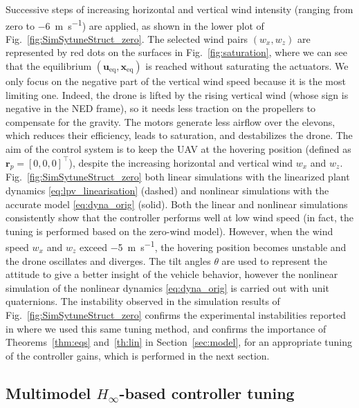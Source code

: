 Successive steps of increasing horizontal and vertical wind intensity (ranging from zero to \SI{-6}{\meter\per\second}) are applied, as shown in the lower plot of Fig.~\ref{fig:SimSytuneStruct_zero}. The selected wind pairs $(w_{x}, w_{z})$ are represented by red dots on the surfaces in Fig.~\ref{fig:saturation}, where we can see that the equilibrium $(\boldsymbol{u}_{\text{eq}}, \boldsymbol{x}_{\text{eq}})$ is reached without saturating the actuators. We only focus on the negative part of the vertical wind speed because it is the most limiting one. Indeed, the drone is lifted by the rising vertical wind (whose sign is negative in the NED frame), so it needs less traction on the propellers to compensate for the gravity. The motors generate less airflow over the elevons, which reduces their efficiency, leads to saturation, and destabilizes the drone.
The aim of the control system is to keep the UAV at the hovering position (defined as $\boldsymbol{r}_{p} = [0,0,0]^\top$), despite the increasing horizontal and vertical wind $w_{x}$ and $w_{z}$. Fig.~\ref{fig:SimSytuneStruct_zero} both linear simulations with the linearized plant dynamics \eqref{eq:lpv_linearisation} (dashed) and nonlinear simulations with the accurate model \eqref{eq:dyna_orig} (solid). Both the linear and nonlinear simulations consistently show that the controller performs well at low wind speed (in fact, the tuning is performed based on the zero-wind model). However, when the wind speed $w_{x}$ and $w_{z}$ exceed \SI{-5}{\meter\per\second}, the hovering position becomes unstable and the drone oscillates and diverges. The tilt angles $\theta$ are used to represent the attitude to give a better insight of the vehicle behavior, however the nonlinear simulation of the nonlinear dynamics \eqref{eq:dyna_orig} is carried out with unit quaternions. The instability observed in the simulation results of Fig.~\ref{fig:SimSytuneStruct_zero} confirms the experimental instabilities reported in \cite{SANSOU:ACA} where we used this same tuning method, and confirms the importance of Theorems~\ref{thm:eqs} and~\ref{th:lin} in Section~\ref{sec:model}, for an appropriate tuning of the controller gains, which is performed in the next section.

\subsection{\texorpdfstring{Multimodel $H_{\infty}$}{H {infty}}-based controller tuning}
\label{sec:h_inf_multi}

